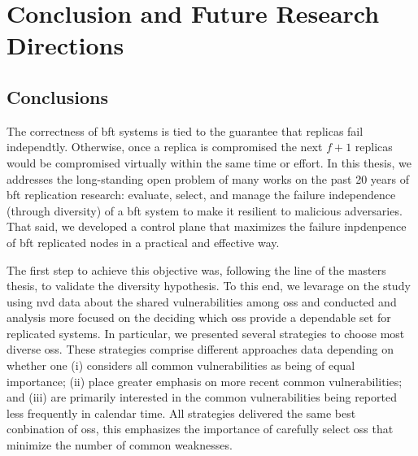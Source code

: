 \chapter{Conclusion and Future Research Directions}
\label{chap:conclusion}

\section{Conclusions}
The correctness of \gls{bft} systems is tied to the guarantee that replicas fail independtly. 
Otherwise, once a replica is compromised the next $f+1$ replicas would be compromised virtually within the same time or effort.
In this thesis, we addresses the long-standing open problem of many works on the past 20 years of \gls{bft} replication research: evaluate, select, and manage the failure independence (through diversity) of a \gls{bft} system to make it resilient to malicious adversaries.
That said, we developed a control plane that maximizes the failure inpdenpence of \gls{bft} replicated nodes in a practical and effective way.


The first step to achieve this objective was, following the line of the masters thesis, to validate the diversity hypothesis.  
To this end, we levarage on the study using \gls{nvd} data about the shared vulnerabilities among \glspl{os} and conducted and analysis more focused on the deciding which \glspl{os} provide a dependable set for replicated systems.
In particular, we presented several strategies to choose most diverse \glspl{os}.
These strategies comprise different approaches data depending on whether one (i) considers all common vulnerabilities as being of equal importance; (ii) place greater emphasis on more recent common vulnerabilities; and (iii) are primarily interested in the common vulnerabilities being reported less frequently in calendar time.
All strategies delivered the same best conbination of \glspl{os}, this emphasizes the importance of carefully select \glspl{os} that minimize the number of common weaknesses.



